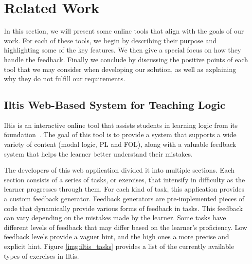 
%

\chapter{Related Work}

In this section, we will present some online tools that align with the goals of our work. For each of these tools, we begin by describing their purpose and highlighting some of the key features. We then give a special focus on how they handle the feedback. Finally we conclude by discussing the positive points of each tool that we may consider when developing our solution, as well as explaining why they do not fulfill our requirements.

\section{Iltis Web-Based System for Teaching Logic}
\label{chap:iltis}

Iltis is an interactive online tool that assists students in learning logic from its foundation~\cite{geck_iltis, geck_2018_introduction}. The goal of this tool is to provide a system that supports a wide variety of content (modal logic, \gls{PL} and \gls{FOL}), along with a valuable feedback system that helps the learner better understand their mistakes. 

The developers of this web application divided it into multiple sections. Each section consists of a series of tasks, or exercises, that intensify in difficulty as the learner progresses through them. For each kind of task, this application provides a custom feedback generator. Feedback generators are pre-implemented pieces of code that dynamically provide various forms of feedback in tasks. This feedback can vary depending on the mistakes made by the learner. Some tasks have different levels of feedback that may differ based on the learner’s proficiency. Low feedback levels provide a vaguer hint, and the high ones a more precise and explicit hint. Figure \ref{img:iltis_tasks} provides a list of the currently available types of exercises in Iltis.

